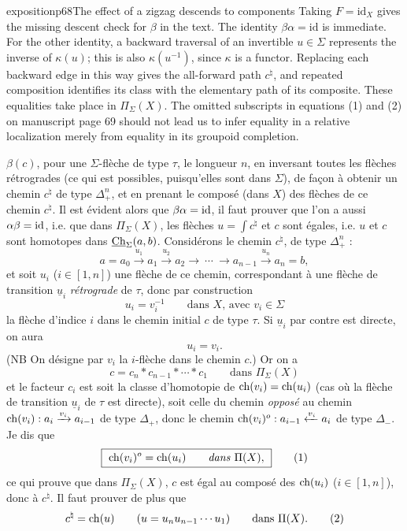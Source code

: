 \begin{dcomment}{exposition}{p68}{The effect of a zigzag descends to components}
Taking $F=\mathrm{id}_X$ gives the missing descent check for $\beta$ in the text. The identity $\beta\alpha=\mathrm{id}$ is immediate. For the other identity, a backward traversal of an invertible $u\in\Sigma$ represents the inverse of $\kappa(u)$; this is also $\kappa(u^{-1})$, since $\kappa$ is a functor. Replacing each backward edge in this way gives the all-forward path $c^\natural$, and repeated composition identifies its class with the elementary path of its composite. These equalities take place in $\Pi_\Sigma(X)$. The omitted subscripts in equations (1) and (2) on manuscript page 69 should not lead us to infer equality in a relative localization merely from equality in its groupoid completion.
\end{dcomment}


$\beta(c)$, pour une $\Sigma$-flèche de type $\tau$, le longueur $n$, en inversant toutes les flèches rétrogrades (ce qui est possibles, puisqu'elles sont dans $\Sigma$), de façon à obtenir un chemin $c^\natural$ de type $\Delta_+^n$, et en prenant le composé (dans $X$) des flèches de ce chemin $c^\natural$. Il est évident alors que $\beta\alpha = \mathrm{id}$, il faut prouver que l'on a aussi $\alpha\beta = \mathrm{id}$, i.e. que dans $\Pi_\Sigma(X)$, les flèches $u = \int c^\natural$ et $c$ sont égales, i.e. $u$ et $c$ sont homotopes dans $\underline{\mathrm{Ch}}_\Sigma(a,b)$. Considérons le chemin $c^\natural$, de type $\Delta_+^n$ : %
\[
a = a_0 \xrightarrow{u_1} a_1 \xrightarrow{u_2} a_2 \longrightarrow \ \cdots \ \longrightarrow a_{n-1} \xrightarrow{u_n} a_n = b,
\]
et soit $u_i$ ($i \in [1,n]$) une flèche de ce chemin, correspondant à une flèche de transition $\underline{u}_i$ \textit{rétrograde} de $\tau$, donc par construction
\[
u_i = v_i^{-1} \qquad \text{dans } X\text{, avec } v_i \in \Sigma
\]
la flèche d'indice $i$ dans le chemin initial $c$ de type $\tau$. Si $\underline{u}_i$ par contre est directe, on aura
\[
u_i = v_i.
\]
(NB On désigne par $v_i$ la $i$-flèche dans le chemin $c$.) Or on a
\[
c = c_n * c_{n-1} * \cdots * c_1 \qquad \text{dans } \Pi_\Sigma(X)
\tag*{$(*)$}
\]
et le facteur $c_i$ est soit la classe d'homotopie de $\mathrm{ch}(v_i) = \mathrm{ch}(u_i)$ (cas où la flèche de transition $\underline{u}_i$ de $\tau$ est directe), soit celle du chemin \textit{opposé} au chemin $\mathrm{ch}(v_i) : a_i \xrightarrow{v_i} a_{i-1}$ de type $\Delta_+$, donc le chemin $\mathrm{ch}(v_i)^o : a_{i-1} \xleftarrow{v_i} a_i$ de type $\Delta_-$. Je dis que
\[
\boxed{\ \ch(v_i)^o = \ch(u_i) \qquad \text{\textit{dans} } \Pi(X),\ }
\tag*{(1)}
\]
ce qui prouve que dans $\Pi_\Sigma(X)$, $c$ est égal au composé des $\mathrm{ch}(u_i)$ ($i \in [1,n]$), donc à $c^\natural$. Il faut prouver de plus que
\[
c^\natural = \ch(u) \qquad (u = u_nu_{n-1}\cdots u_1) \qquad \text{dans } \Pi(X).
\tag*{(2)}
\]

